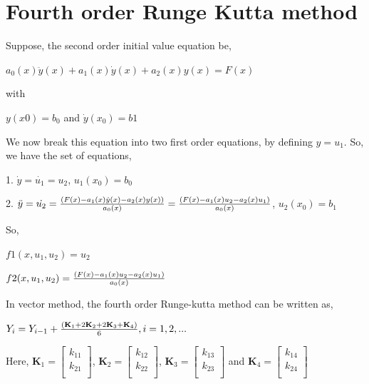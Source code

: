 \documentclass{article}
\begin{document}
\section{Fourth order Runge Kutta method}
Suppose, the second order initial value equation be,
\begin{center}
$a_0(x)\ddot{y}(x)+a_1(x)\dot{y}(x)+a_2(x)y(x)=F(x)$
\end{center}
with
\begin{center}
$y(x0)=b_0$ and $\dot{y}(x_0)=b1$
\end{center}
We now break this equation into two first order equations, by defining $y=u_1$. So, we have the set of equations, \par
1. $\dot{y}=\dot{u_1}=u_2$, $u_1(x_0)=b_0$\par
2. $\ddot{y}=\dot{u_2}={(F(x) - a_1(x)\dot{y}(x)-a_2(x)y(x)) \over a_0(x)}={(F(x)-a_1(x)u_2-a_2(x)u_1) \over a_0(x)}$, $u_2(x_0)=b_1$ \\ \par
So, \begin{center}
$f1(x, u_1, u_2)=u_2$\\ \par
$f2(x, u_1, u_2)={(F(x)-a_1(x)u_2-a_2(x)u_1) \over a_0(x)}$\\ \par
\end{center}
In vector method, the fourth order Runge-kutta method can be written as,
\begin{center}
$Y_{i}=Y_{i-1}+{(\textbf{K}_1+2\textbf{K}_2+2\textbf{K}_3+\textbf{K}_4) \over 6}, i=1, 2, ...$ \\ \par
\end{center}
Here,
$\textbf{K}_1=\begin{bmatrix}
k_{11}\\
k_{21}\\
\end{bmatrix}$, $\textbf{K}_2=\begin{bmatrix}
k_{12}\\
k_{22}\\
\end{bmatrix}$, $\textbf{K}_3=\begin{bmatrix}
k_{13}\\
k_{23}\\
\end{bmatrix}$ and $\textbf{K}_4=\begin{bmatrix}
k_{14}\\
k_{24}\\
\end{bmatrix}$
\end{document}
